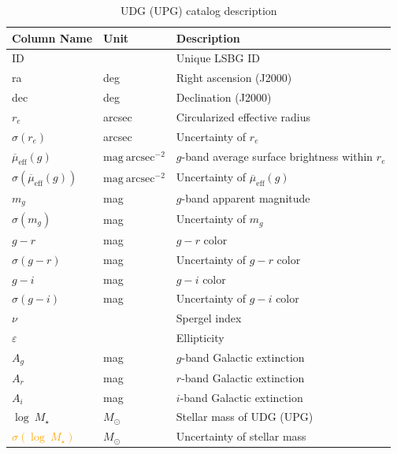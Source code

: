 \documentclass[twocolumn,astrosymb,twocolappendix,linenumbers]{aastex631}
\newcommand{\sbunit}{\mathrm{mag\ arcsec}^{-2}}
\newcommand{\emphasize}{\textcolor{orange}}
\begin{document}
\begin{CJK*}{UTF8}{gbsn}
\begin{table}
\caption{UDG (UPG) catalog description} 
\label{tab:catalog}
\begin{center}
\begin{tabular}{l l l}
\hline\hline
Column Name      & Unit    & Description                    \\
\hline
ID                       &         & Unique LSBG ID \\
ra                       & deg     & Right ascension (J2000) \\
dec                      & deg     & Declination (J2000) \\
$r_e$         & arcsec  & Circularized effective radius  \\
$\sigma(r_e)$ & arcsec  & Uncertainty of $r_e$ \\
$\overline{\mu}_{\mathrm{eff}}(g)$               & $\sbunit$ & $g$-band average surface brightness within $r_e$ \\
$\sigma(\overline{\mu}_{\mathrm{eff}}(g))$       & $\sbunit$ & Uncertainty of $\overline{\mu}_{\mathrm{eff}}(g)$           \\
$m_g$                    & mag     & $g$-band apparent magnitude     \\
$\sigma(m_g)$            & mag     & Uncertainty of $m_g$            \\
$g-r$                    & mag     & $g-r$ color                     \\
$\sigma(g-r)$            & mag     & Uncertainty of $g-r$ color      \\
$g-i$                    & mag     & $g-i$ color                     \\
$\sigma(g-i)$            & mag     & Uncertainty of $g-i$ color      \\
$\nu$                    &         & Spergel index              \\
$\varepsilon$            &         & Ellipticity                     \\
$A_g$                    & mag     & $g$-band Galactic extinction \\
$A_r$                    & mag     & $r$-band Galactic extinction \\
$A_i$                    & mag     & $i$-band Galactic extinction \\
$\log\ M_\star$ & $M_\odot$ & Stellar mass of UDG (UPG) \\
\emphasize{$\sigma(\log\ M_\star)$} & $M_\odot$ & Uncertainty of stellar mass\\

\end{tabular}
\end{center}
\end{table}
\end{CJK*}
\end{document}
